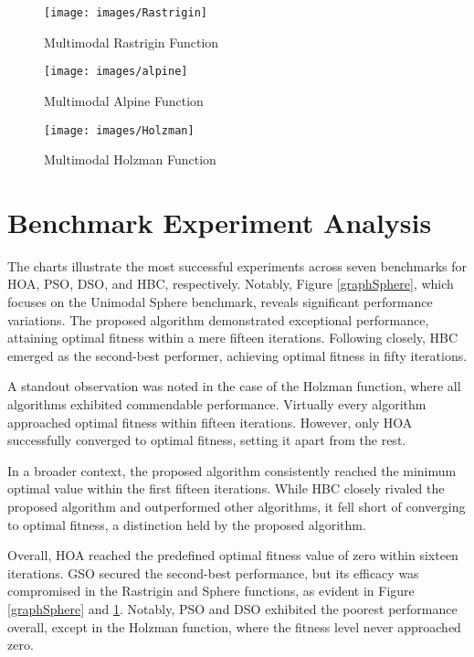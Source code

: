 \documentclass[conference]{IEEEtran}
\begin{document}
\begin{abstract1}
\begin{figure}[htbp]
	\centerline{\texttt{[image: images/Rastrigin]}}
	\caption{Multimodal Rastrigin Function}
	\label{graphRast}
\end{figure}

\begin{figure}[htbp]
	\centerline{\texttt{[image: images/alpine]}}
	\caption{Multimodal Alpine Function}
	\label{graphAlpine}
\end{figure}

\begin{figure}[htbp]
	\centerline{\texttt{[image: images/Holzman]}}
	\caption{Multimodal Holzman Function}
	\label{graphHolz}
\end{figure}

\section{Benchmark Experiment Analysis}

The charts illustrate the most successful experiments across seven benchmarks for HOA, PSO, DSO, and HBC, respectively. Notably, Figure \ref{graphSphere}, which focuses on the Unimodal Sphere benchmark, reveals significant performance variations. The proposed algorithm demonstrated exceptional performance, attaining optimal fitness within a mere fifteen iterations. Following closely, HBC emerged as the second-best performer, achieving optimal fitness in fifty iterations.

A standout observation was noted in the case of the Holzman function, where all algorithms exhibited commendable performance. Virtually every algorithm approached optimal fitness within fifteen iterations. However, only HOA successfully converged to optimal fitness, setting it apart from the rest.

In a broader context, the proposed algorithm consistently reached the minimum optimal value within the first fifteen iterations. While HBC closely rivaled the proposed algorithm and outperformed other algorithms, it fell short of converging to optimal fitness, a distinction held by the proposed algorithm.

Overall, HOA reached the predefined optimal fitness value of zero within sixteen iterations. GSO secured the second-best performance, but its efficacy was compromised in the Rastrigin and Sphere functions, as evident in Figure \ref{graphSphere} and \ref{graphRast}. Notably, PSO and DSO exhibited the poorest performance overall, except in the Holzman function, where the fitness level never approached zero.




\end{abstract1}
\end{document}
